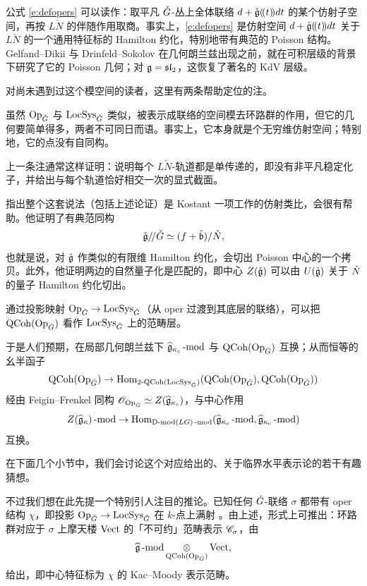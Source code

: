 公式 \eqref{e:defopers} 可以读作：取平凡 $\cG$-丛上全体联络 $d + \cfg(\!(t)\!)dt$ 的某个仿射子空间，再按 $L\check{N}$ 的伴随作用取商。事实上，\eqref{e:defopers} 是仿射空间 $d + \cfg(\!(t)\!)dt$ 关于 $L\check{N}$ 的一个通用特征标的 Hamilton 约化，特别地带有典范的 Poisson 结构。Gelfand--Dikii 与 Drinfeld--Sokolov \cite{drinfeldsokolov} 在几何朗兰兹出现之前，就在可积层级的背景下研究了它的 Poisson 几何；对 $\fg = \fsl_2$，这恢复了著名的 KdV 层级。

对尚未遇到过这个模空间的读者，这里有两条帮助定位的注。

\begin{re} 虽然 $\Op$ 与 $\LS$ 类似，被表示成联络的空间模去环路群的作用，但它的几何要简单得多，两者不可同日而语。事实上，它本身就是个无穷维仿射空间；特别地，它的点没有自同构。
\end{re}

\begin{re} 上一条注通常这样证明：说明每个 $L\check{N}$-轨道都是单传递的，即没有非平凡稳定化子，并给出与每个轨道恰好相交一次的显式截面。

指出整个这套说法（包括上述论证）是 Kostant \cite{kostantslice} 一项工作的仿射类比，会很有帮助。他证明了有典范同构
\[
\cfg /\!/ \cG \simeq (f + \check{\fb}) / \check{N},
\]
也就是说，对 $\cfg$ 作类似的有限维 Hamilton 约化，会切出 Poisson 中心的一个拷贝。此外，他证明两边的自然量子化是匹配的，即中心 $Z(\cfg)$ 可以由 $U(\cfg)$ 关于 $\cN$ 的量子 Hamilton 约化切出。\end{re}

\ssszh 通过投影映射 $\Op \rightarrow \LS$（从 oper 过渡到其底层的联络），可以把 $\QCoh(\Op)$ 看作 $\LS$ 上的范畴层。

于是人们预期，在局部几何朗兰兹下 $\gkc\mod$ 与 $\QCoh(\Op)$ 互换；从而恒等的幺半函子
\[
\QCoh(\Op) \rightarrow \Hom_{\TwoCoh(\LS)}(\QCoh(\Op), \QCoh(\Op))
\]
经由 Feigin--Frenkel 同构 $\OO_{\Op} \simeq Z(\gkc)$，与中心作用
\[
Z(\fgk)\mod \rightarrow \Hom_{\Dmod(LG)\mod}(\gkc\mod, \gkc\mod)
\]
互换。

在下面几个小节中，我们会讨论这个对应给出的、关于临界水平表示论的若干有趣猜想。

不过我们想在此先提一个特别引人注目的推论。已知任何 $\cG$-联络 $\sigma$ 都带有 oper 结构 $\chi$，即投影 $\Op \rightarrow \LS$ 在 $k$-点上满射 \cite{frenkelzhuoper}。由上述，形式上可推出：环路群对应于 $\sigma$ 上摩天楼 $\Vect$ 的「不可约」范畴表示 $\sC_{\sigma}$，由
\begin{equation} \label{e:kmcenc}
\gk\mod \underset{\QCoh(\Op)} \otimes \Vect,
\end{equation}
给出，即中心特征标为 $\chi$ 的 Kac--Moody 表示范畴。

